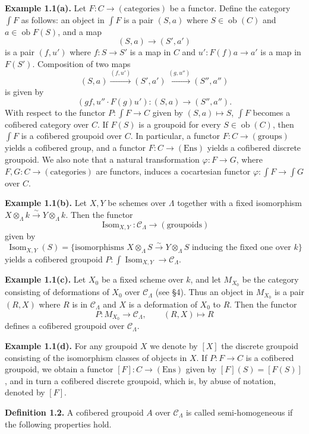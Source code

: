 \documentclass[11pt]{article}
\providecommand{\Isom}{\operatorname{Isom}}
\providecommand{\ob}{\operatorname{ob}}
\providecommand{\Ens}{\mathrm{Ens}}
\providecommand{\CL}{\mathcal C_\Lambda}
\providecommand{\Isom}{\operatorname{Isom}}
\begin{document}
\textbf{Example 1.1(a).} Let $F:C\to(\mathrm{categories})$ be a functor. Define the category $\int F$ as follows: an object in $\int F$ is a pair $(S,a)$ where $S\in\ob(C)$ and $a\in\ob F(S)$, and a map
\[
 (S,a)\longrightarrow (S',a')
\]
is a pair $(f,u')$ where $f:S\to S'$ is a map in $C$ and $u':F(f)a\to a'$ is a map in $F(S')$. Composition of two maps
\[
 (S,a)\xrightarrow{(f,u')}(S',a')\xrightarrow{(g,u'')}(S'',a'')
\]
is given by
\[
 (gf,u''\cdot F(g)u'):(S,a)\longrightarrow (S'',a'').
\]
With respect to the functor $P:\int F\to C$ given by $(S,a)\mapsto S$, $\int F$ becomes a cofibered category over $C$. If $F(S)$ is a groupoid for every $S\in\ob(C)$, then $\int F$ is a cofibered groupoid over $C$. In particular, a functor $F:C\to(\mathrm{groups})$ yields a cofibered group, and a functor $F:C\to(\Ens)$ yields a cofibered discrete groupoid. We also note that a natural transformation $\varphi:F\to G$, where $F,G:C\to(\mathrm{categories})$ are functors, induces a cocartesian functor $\varphi:\int F\to\int G$ over $C$.

\textbf{Example 1.1(b).} Let $X,Y$ be schemes over $\Lambda$ together with a fixed isomorphism $X\otimes_\Lambda k\xrightarrow{\sim}Y\otimes_\Lambda k$. Then the functor
\[
 \Isom_{X,Y}:\CL\longrightarrow(\mathrm{groupoids})
\]
given by
\[
 \Isom_{X,Y}(S)=\{\text{isomorphisms }X\otimes_\Lambda S\xrightarrow{\sim}Y\otimes_\Lambda S\text{ inducing the fixed one over }k\}
\]
yields a cofibered groupoid $P:\int\Isom_{X,Y}\to\CL$.

\textbf{Example 1.1(c).} Let $X_0$ be a fixed scheme over $k$, and let $M_{X_0}$ be the category consisting of deformations of $X_0$ over $\CL$ (see \S4). Thus an object in $M_{X_0}$ is a pair $(R,X)$ where $R$ is in $\CL$ and $X$ is a deformation of $X_0$ to $R$. Then the functor
\[
 P:M_{X_0}\longrightarrow\CL,
 \qquad (R,X)\longmapsto R
\]
defines a cofibered groupoid over $\CL$.

\textbf{Example 1.1(d).} For any groupoid $X$ we denote by $[X]$ the discrete groupoid consisting of the isomorphism classes of objects in $X$. If $P:F\to C$ is a cofibered groupoid, we obtain a functor $[F]:C\to(\Ens)$ given by $[F](S)=[F(S)]$, and in turn a cofibered discrete groupoid, which is, by abuse of notation, denoted by $[F]$.

\textbf{Definition 1.2.} A cofibered groupoid $A$ over $\CL$ is called semi-homogeneous if the following properties hold.
\end{document}
